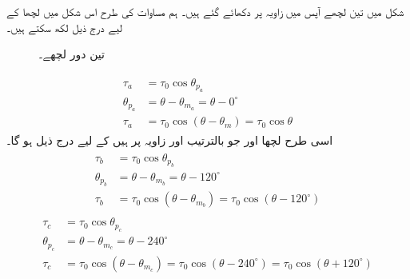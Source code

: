  شکل   میں تین لچھے آپس میں  زاویہ پر دکھائے گئے ہیں۔ ہم مساوات    کی طرح اس شکل میں لچھا   کے لیے درج ذیل لکھ سکتے ہیں۔
\begin{figure}
\centering
\caption{تین دور لچھے۔}
\label{شکل_گھومتے_مشین_تین_دور_لچھے}
\end{figure}
%
\begin{gather}
\begin{aligned}\label{مساوات_گھومتے_مشین_الف_موج}
\tau_a&=\tau_0 \cos \theta_{p_a}\\
\theta_{p_a}&=\theta-\theta_{m_a}=\theta-0^{\circ}\\
\tau_a&=\tau_0 \cos (\theta-\theta_m)=\tau_0 \cos \theta
\end{aligned}
\end{gather}
اسی طرح لچھا  اور  جو بالترتیب  اور   زاویہ پر ہیں کے لیے درج ذیل ہو گا۔
\begin{gather}
\begin{aligned}\label{مساوات_گھومتے_مشین_ب_موج}
\tau_b&=\tau_0 \cos \theta_{p_b}\\
\theta_{p_b}&=\theta-\theta_{m_b}=\theta-120^{\circ}\\
\tau_b&=\tau_0 \cos (\theta-\theta_{m_b})=\tau_0 \cos (\theta-120^{\circ})
\end{aligned}
\end{gather}
%
\begin{gather}
\begin{aligned}\label{مساوات_گھومتے_مشین_پ_موج}
\tau_c&=\tau_0 \cos \theta_{p_c}\\
\theta_{p_c}&=\theta-\theta_{m_c}=\theta-240^{\circ}\\
\tau_c&=\tau_0 \cos (\theta-\theta_{m_c})=\tau_0 \cos (\theta-240^{\circ})=\tau_0 \cos (\theta+120^{\circ})
\end{aligned}
\end{gather}

